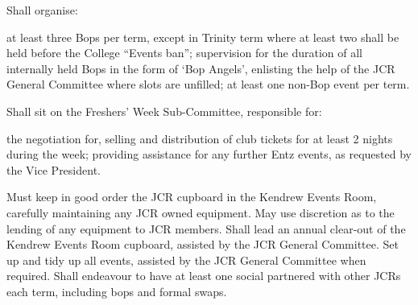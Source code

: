 Shall organise:\begin{enumerate}
at least three Bops per term, except in Trinity term where at least two shall be held before the College “Events ban”;
supervision for the duration of all internally held Bops in the form of `Bop Angels', enlisting the help of the JCR General Committee where slots are unfilled; 
at least one non-Bop event per term.\end{enumerate}
Shall sit on the Freshers' Week Sub-Committee, responsible for:\begin{enumerate}
the negotiation for, selling and distribution of club tickets for at least 2 nights during the week;
providing assistance for any further Entz events, as requested by the Vice President.\end{enumerate}
Must keep in good order the JCR cupboard in the Kendrew Events Room, carefully maintaining any JCR owned equipment. May use discretion as to the lending of any equipment to JCR members.
Shall lead an annual clear-out of the Kendrew Events Room cupboard, assisted by the JCR General Committee.
Set up and tidy up all events, assisted by the JCR General Committee when required.
Shall endeavour to have at least one social partnered with other JCRs each term, including bops and formal swaps.
